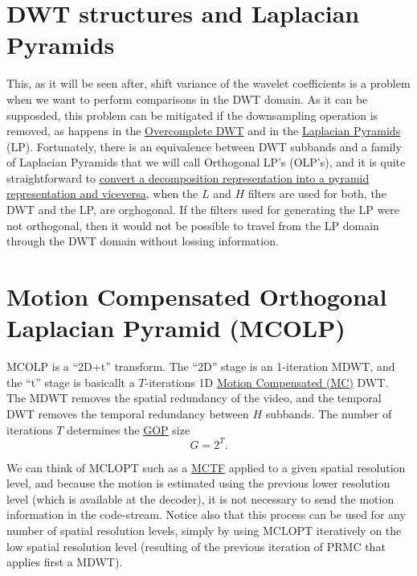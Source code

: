 
\section{DWT structures and Laplacian Pyramids}

This, as it will be seen after, shift variance of the wavelet
coefficients is a problem when we want to perform comparisons in the
DWT domain. As it can be supposded, this problem can be mitigated if
the downsampling operation is removed, as happens in the
\href{https://ieeexplore.ieee.org/document/1408191}{Overcomplete DWT}
and in the
\href{http://fourier.eng.hmc.edu/e161/lectures/canny/node3.html}{Laplacian
  Pyramids} (LP). Fortunately, there is an equivalence between DWT
subbands and a family of Laplacian Pyramids that we will call
Orthogonal LP's (OLP's), and it is quite straightforward to
\href{https://vicente-gonzalez-ruiz.github.io/pyramids-and-wavelets/}{convert
  a decomposition representation into a pyramid representation and
  viceversa}, when the $L$ and $H$ filters are used for both, the DWT
and the LP, are orghogonal. If the filters used for generating the LP
were not orthogonal, then it would not be possible to travel from the
LP domain through the DWT domain without lossing information.


\section{Motion Compensated Orthogonal Laplacian Pyramid (MCOLP)}

MCOLP is a ``2D+t'' transform. The ``2D'' stage is an 1-iteration
MDWT, and the ``t'' stage is basicallt a $T$-iterations 1D
\href{https://en.wikipedia.org/wiki/Motion_compensation}{Motion
  Compensated (MC)} DWT. The MDWT removes the spatial redundancy of
the video, and the temporal DWT removes the temporal redundancy
between $H$ subbands. The number of iterations $T$ determines the
\href{https://en.wikipedia.org/wiki/Group_of_pictures}{GOP} size
\begin{equation}
  G=2^T.
  \label{eq:GOP_size}
\end{equation}

We can think of MCLOPT such as a
\href{https://ieeexplore.ieee.org/abstract/document/1369697}{MCTF}
applied to a given spatial resolution level, and because the motion is
estimated using the previous lower resolution level (which is
available at the decoder), it is not necessary to send the motion
information in the code-stream. Notice also that this process can be
used for any number of spatial resolution levels, simply by using
MCLOPT iteratively on the low spatial resolution level (resulting of
the previous iteration of PRMC that applies first a MDWT).

